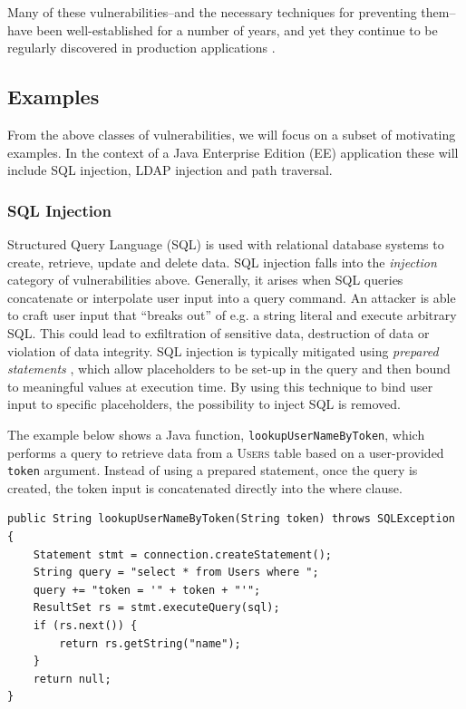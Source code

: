 \documentclass[a4paper,openany,12pt]{book}
\begin{document}
Many of these vulnerabilities--and the necessary techniques for preventing them--have been well-established for a
number of years, and yet they continue to be regularly discovered in production applications \citep[p.~2]{schneier2011secrets}.

\subsection{Examples}\label{subsec:examples}

From the above classes of vulnerabilities, we will focus on a subset of motivating examples.
In the context of a Java Enterprise Edition (EE) application these will include SQL injection, LDAP injection and
path traversal.

\subsubsection{SQL Injection}
\label{ex:sqli}

Structured Query Language (SQL) is used with relational database systems to create, retrieve, update and delete data.
SQL injection falls into the \emph{injection} category of vulnerabilities above.
Generally, it arises when SQL queries concatenate or interpolate user input into a query command.
An attacker is able to craft user input that ``breaks out'' of e.g. a string literal and execute arbitrary SQL.
This could lead to exfiltration of sensitive data, destruction of data or violation of data integrity.
SQL injection is typically mitigated using \emph{prepared statements} \citep{stuttard2011web}, which allow placeholders to be set-up in the
query and then bound to meaningful values at execution time.
By using this technique to bind user input to specific placeholders, the possibility to inject SQL is removed.

The example below shows a Java function, \texttt{lookupUserNameByToken}, which performs a query to retrieve data from
a \textsc{Users} table based on a user-provided \texttt{token} argument.
Instead of using a prepared statement, once the query is created, the token input is concatenated directly into the
\textcolor{id7-aubergine}{where} clause.

\newsavebox\myv

\begin{lrbox}{\myv}\begin{minipage}{\textwidth}
\begin{verbatim}
public String lookupUserNameByToken(String token) throws SQLException {
    Statement stmt = connection.createStatement();
    String query = "select * from Users where ";
    query += "token = '" + token + "'";
    ResultSet rs = stmt.executeQuery(sql);
    if (rs.next()) {
        return rs.getString("name");
    }
    return null;
}
\end{verbatim}
\end{minipage}\end{lrbox}
\end{document}
